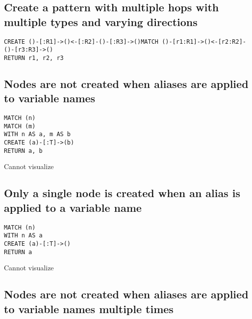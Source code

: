 \subsection{Create a pattern with multiple hops with multiple types and varying directions}

\begin{lstlisting}
CREATE ()-[:R1]->()<-[:R2]-()-[:R3]->()MATCH ()-[r1:R1]->()<-[r2:R2]-()-[r3:R3]->()
RETURN r1, r2, r3
\end{lstlisting}

\subsection{Nodes are not created when aliases are applied to variable names}

\begin{lstlisting}
MATCH (n)
MATCH (m)
WITH n AS a, m AS b
CREATE (a)-[:T]->(b)
RETURN a, b
\end{lstlisting}

Cannot visualize
\subsection{Only a single node is created when an alias is applied to a variable name}

\begin{lstlisting}
MATCH (n)
WITH n AS a
CREATE (a)-[:T]->()
RETURN a
\end{lstlisting}

Cannot visualize
\subsection{Nodes are not created when aliases are applied to variable names multiple times}

